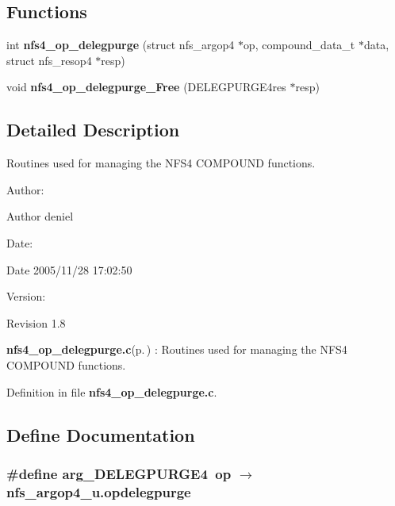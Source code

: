 \subsection*{Functions}
\begin{CompactItemize}
\item 
int {\bf nfs4\_\-op\_\-delegpurge} (struct nfs\_\-argop4 $\ast$op, compound\_\-data\_\-t $\ast$data, struct nfs\_\-resop4 $\ast$resp)
\item 
void {\bf nfs4\_\-op\_\-delegpurge\_\-Free} (DELEGPURGE4res $\ast$resp)
\end{CompactItemize}


\subsection{Detailed Description}
Routines used for managing the NFS4 COMPOUND functions. 

\begin{Desc}
\item[Author:]\begin{Desc}
\item[Author]deniel \end{Desc}
\end{Desc}
\begin{Desc}
\item[Date:]\begin{Desc}
\item[Date]2005/11/28 17:02:50 \end{Desc}
\end{Desc}
\begin{Desc}
\item[Version:]\begin{Desc}
\item[Revision]1.8 \end{Desc}
\end{Desc}
{\bf nfs4\_\-op\_\-delegpurge.c}{\rm (p.\,\pageref{nfs4__op__delegpurge_8c})} : Routines used for managing the NFS4 COMPOUND functions.

Definition in file {\bf nfs4\_\-op\_\-delegpurge.c}.

\subsection{Define Documentation}
\subsubsection{\setlength{\rightskip}{0pt plus 5cm}\#define arg\_\-DELEGPURGE4\ op $\rightarrow$ nfs\_\-argop4\_\-u.opdelegpurge}\label{nfs4__op__delegpurge_8c_a0}


